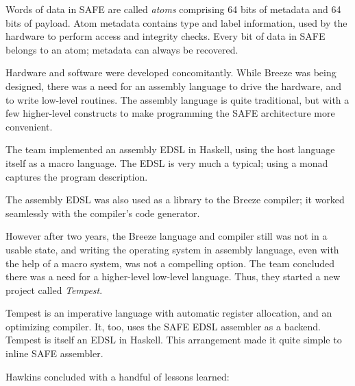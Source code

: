 \documentclass{jfp1}
\begin{document}
Words of data in SAFE are called \textit{atoms} comprising 64 bits of 
metadata and 64 bits of payload. Atom metadata contains type and
label information, used by the hardware to perform access and integrity
checks. Every bit of data in SAFE belongs to an atom; metadata can always
be recovered.

Hardware and software were developed concomitantly. While Breeze was
being designed, there was a need for an assembly language to drive the 
hardware, and to write low-level routines. The assembly language is quite
traditional, but with a few higher-level constructs to make programming
the SAFE architecture more convenient.

The team implemented an assembly EDSL in Haskell, using the host
language itself as a macro language. The EDSL is very much a typical;
using a monad captures the program description. 

The assembly EDSL was also used as a library to the Breeze compiler;
it worked seamlessly with the compiler's code generator.

However after two years, the Breeze language and compiler still was not in
a usable state, and writing the operating system in assembly language,
even with the help of a macro system, was not a compelling option. The
team concluded there was a need for a higher-level low-level language. Thus,
they started a new project called \textit{Tempest}.

Tempest is an imperative language with automatic register allocation,
and an optimizing compiler. It, too, uses the SAFE EDSL assembler
as a backend. Tempest is itself an EDSL in Haskell. This arrangement
made it quite simple to inline SAFE assembler.

Hawkins concluded with a handful of lessons learned:
\end{document}
